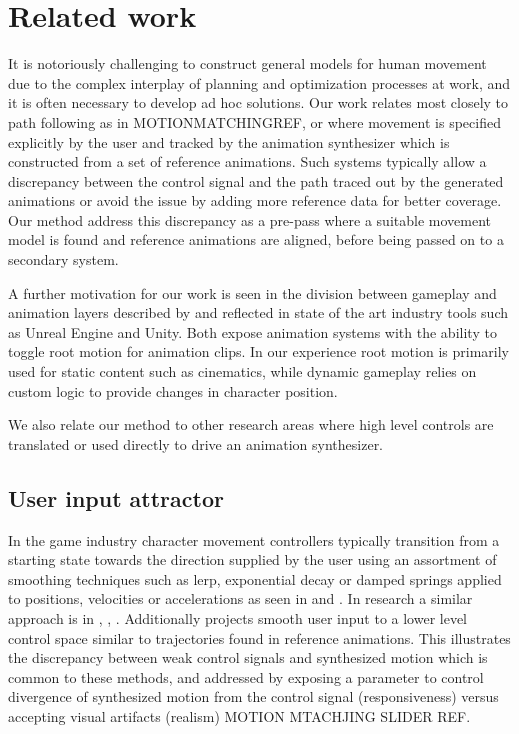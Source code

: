 \section{Related work}
It is notoriously challenging to construct general models for human movement due to the complex interplay of planning and optimization processes at work, and it is often necessary to develop ad hoc solutions. Our work relates most closely to path following as in MOTIONMATCHINGREF, \citep{holden.16} or \citep{startke20} where movement is specified explicitly by the user and tracked by the animation synthesizer which is constructed from a set of reference animations. Such systems typically allow a discrepancy between the control signal and the path traced out by the generated animations or avoid the issue by adding more reference data for better coverage. Our method address this discrepancy as a pre-pass where a suitable movement model is found and reference animations are aligned, before being passed on to a secondary system.  

A further motivation for our work is seen in the division between gameplay and animation layers described by \citep{holden18} and reflected in state of the art industry tools such as Unreal Engine and Unity. Both expose animation systems with the ability to toggle root motion for animation clips. In our experience root motion is primarily used for static content such as cinematics, while dynamic gameplay relies on custom logic to provide changes in character position.

We also relate our method to other research areas where high level controls are translated or used directly to drive an animation synthesizer. 

\subsection{User input attractor}
In the game industry character movement controllers typically transition from a starting state towards the direction supplied by the user using an assortment of smoothing techniques such as lerp, exponential decay or damped springs applied to positions, velocities or accelerations as seen in \citep{buttner20} and \citep{holden21}. 
In research a similar approach is in \citep{mccann07}, \citep{holden.16}, \citep{Zhang18}. Additionally \citep{startke20} projects smooth user input to a lower level control space similar to trajectories found in reference animations. This illustrates the discrepancy between weak control signals and synthesized motion which is common to these methods, and addressed by exposing a parameter to control divergence of synthesized motion from the control signal (responsiveness) versus accepting visual artifacts (realism) MOTION MTACHJING SLIDER REF. 

